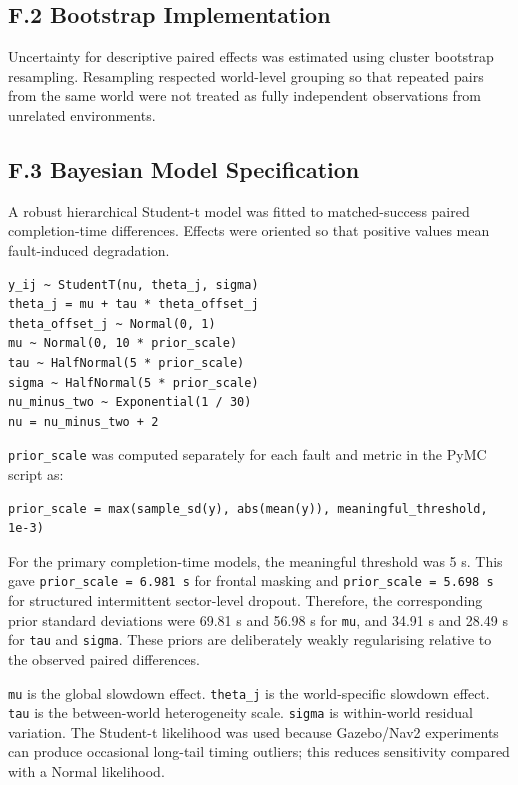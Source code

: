 \hypertarget{f.2-bootstrap-implementation}{%
\subsection{F.2 Bootstrap Implementation}\label{f.2-bootstrap-implementation}}

Uncertainty for descriptive paired effects was estimated using cluster bootstrap resampling. Resampling respected world-level grouping so that repeated pairs from the same world were not treated as fully independent observations from unrelated environments.

\hypertarget{f.3-bayesian-model-specification}{%
\subsection{F.3 Bayesian Model Specification}\label{f.3-bayesian-model-specification}}

A robust hierarchical Student-t model was fitted to matched-success paired completion-time differences. Effects were oriented so that positive values mean fault-induced degradation.

\begin{verbatim}
y_ij ~ StudentT(nu, theta_j, sigma)
theta_j = mu + tau * theta_offset_j
theta_offset_j ~ Normal(0, 1)
mu ~ Normal(0, 10 * prior_scale)
tau ~ HalfNormal(5 * prior_scale)
sigma ~ HalfNormal(5 * prior_scale)
nu_minus_two ~ Exponential(1 / 30)
nu = nu_minus_two + 2
\end{verbatim}

\texttt{prior\_scale} was computed separately for each fault and metric in the PyMC script as:

\begin{verbatim}
prior_scale = max(sample_sd(y), abs(mean(y)), meaningful_threshold, 1e-3)
\end{verbatim}

For the primary completion-time models, the meaningful threshold was 5 s. This gave \texttt{prior\_scale\ =\ 6.981\ s} for frontal masking and \texttt{prior\_scale\ =\ 5.698\ s} for structured intermittent sector-level dropout. Therefore, the corresponding prior standard deviations were 69.81 s and 56.98 s for \texttt{mu}, and 34.91 s and 28.49 s for \texttt{tau} and \texttt{sigma}. These priors are deliberately weakly regularising relative to the observed paired differences.

\texttt{mu} is the global slowdown effect. \texttt{theta\_j} is the world-specific slowdown effect. \texttt{tau} is the between-world heterogeneity scale. \texttt{sigma} is within-world residual variation. The Student-t likelihood was used because Gazebo/Nav2 experiments can produce occasional long-tail timing outliers; this reduces sensitivity compared with a Normal likelihood.

